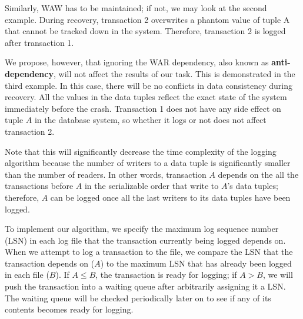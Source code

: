 Similarly, WAW has to be maintained; if not, we may look at the second example. During recovery, transaction 2 overwrites a phantom value of tuple A that cannot be tracked down in the system. Therefore, transaction 2 is logged after transaction 1.

We propose, however, that ignoring the WAR dependency, also known as  \textbf{anti-dependency}, will not affect the results of our task. This is demonstrated in the third example. In this case, there will be no conflicts in data consistency during recovery. All the values in the data tuples reflect the exact state of the system immediately before the crash. Transaction 1 does not have any side effect on tuple $A$ in the database system, so whether it logs or not does not affect transaction 2.\par

Note that this will significantly decrease the time complexity of the logging algorithm because the number of writers to a data tuple is significantly smaller than the number of readers. In other words, transaction $A$ depends on the all the transactions before $A$ in the serializable order that write to $A$'s data tuples; therefore, $A$ can be logged once all the last writers to its data tuples have been logged. \par

To implement our algorithm, we specify the maximum log sequence number (LSN) in each log file that the transaction currently being logged depends on. When we attempt to log a transaction to the file, we compare the LSN that the transaction depends on ($A$) to the maximum LSN that has already been logged in each file ($B$). If $A\leq B$, the transaction is ready for logging; if $A>B$, we will push the transaction into a waiting queue after arbitrarily assigning it a LSN. The waiting queue will be checked periodically later on to see if any of its contents becomes ready for logging.\par

